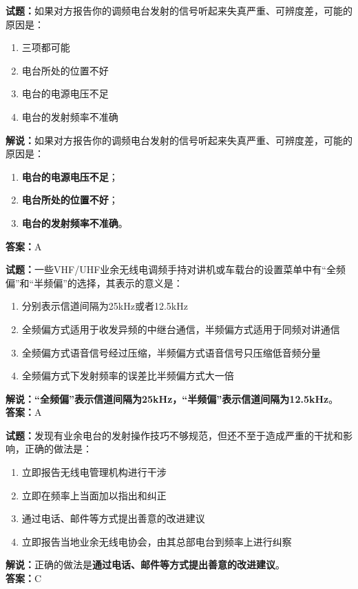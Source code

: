 \documentclass{ctexbook}
\begin{document}
\noindent\textbf{试题：}如果对方报告你的调频电台发射的信号听起来失真严重、可辨度差，可能的原因是：
\begin{enumerate}[leftmargin=3em]
\item 三项都可能
\item 电台所处的位置不好
\item 电台的电源电压不足
\item 电台的发射频率不准确
\end{enumerate}
\noindent\textbf{解说：}如果对方报告你的调频电台发射的信号听起来失真严重、可辨度差，可能的原因是：
\begin{enumerate}[label=, leftmargin=3em]
\item \textbf{电台的电源电压不足}；
\item \textbf{电台所处的位置不好}；
\item \textbf{电台的发射频率不准确}。
\end{enumerate}
\noindent\textbf{答案：}A



\bigskip


\noindent\textbf{试题：}一些VHF/UHF业余无线电调频手持对讲机或车载台的设置菜单中有“全频偏”和“半频偏”的选择，其表示的意义是：
\begin{enumerate}[leftmargin=3em]
\item 分别表示信道间隔为25\unit{\kHz}或者12.5\unit{\kHz}
\item 全频偏方式适用于收发异频的中继台通信，半频偏方式适用于同频对讲通信
\item 全频偏方式语音信号经过压缩，半频偏方式语音信号只压缩低音频分量
\item 全频偏方式下发射频率的误差比半频偏方式大一倍
\end{enumerate}
\noindent\textbf{解说：}\textbf{“全频偏”表示信道间隔为25\unit{\kHz}，“半频偏”表示信道间隔为12.5\unit{\kHz}}。\\\noindent\textbf{答案：}A



\bigskip


\noindent\textbf{试题：}发现有业余电台的发射操作技巧不够规范，但还不至于造成严重的干扰和影响，正确的做法是：
\begin{enumerate}[leftmargin=3em]
\item 立即报告无线电管理机构进行干涉
\item 立即在频率上当面加以指出和纠正
\item 通过电话、邮件等方式提出善意的改进建议
\item 立即报告当地业余无线电协会，由其总部电台到频率上进行纠察
\end{enumerate}
\noindent\textbf{解说：}正确的做法是\textbf{通过电话、邮件等方式提出善意的改进建议}。\\\noindent\textbf{答案：}C
\end{document}
